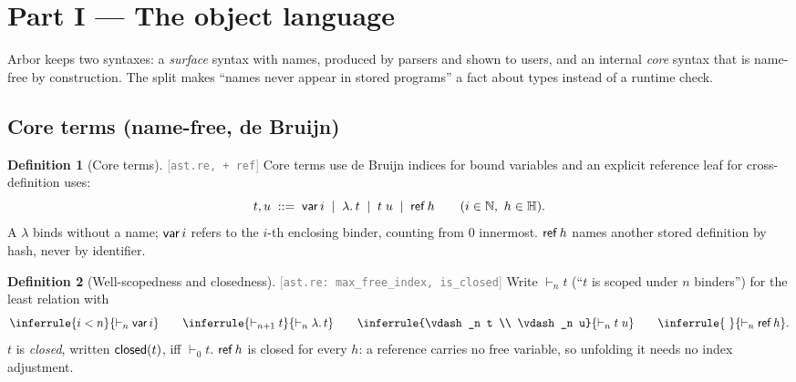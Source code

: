 \documentclass[11pt]{article}
\theoremstyle{definition}
\newtheorem{definition}{Definition}[section]
\theoremstyle{plain}
\theoremstyle{remark}
\newcommand{\src}[1]{{\footnotesize\textcolor{gray}{[\texttt{#1}]}}}
\begin{document}
\section{Part I --- The object language}\label{sec:lang}

Arbor keeps two syntaxes: a \emph{surface} syntax with names, produced by parsers and shown to
users, and an internal \emph{core} syntax that is name-free by construction. The split makes
``names never appear in stored programs'' a fact about types instead of a runtime check.

\subsection{Core terms (name-free, de Bruijn)}

\begin{definition}[Core terms]\label{def:core}
\src{ast.re, +\,ref} Core terms use de Bruijn indices for bound variables and an explicit
reference leaf for cross-definition uses:
\[
  t,u \;::=\; \mathsf{var}\,i \;\mid\; \lambda.\,t \;\mid\; t\;u \;\mid\; \mathsf{ref}\,h
  \qquad (i \in \mathbb{N},\ h \in \mathbb{H}).
\]
A $\lambda$ binds without a name; $\mathsf{var}\,i$ refers to the $i$-th enclosing binder, counting from
$0$ innermost. $\mathsf{ref}\,h$ names another stored definition by hash, never by identifier.
\end{definition}

\begin{definition}[Well-scopedness and closedness]\label{def:closed}
\src{ast.re: max\_free\_index, is\_closed} Write $\vdash_n t$ (``$t$ is scoped under $n$
binders'') for the least relation with
\[
  \inferrule{i < n}{\vdash_n \Var{i}}\qquad
  \inferrule{\vdash_{n+1} t}{\vdash_n \Lam{t}}\qquad
  \inferrule{\vdash_n t \\ \vdash_n u}{\vdash_n \App{t}{u}}\qquad
  \inferrule{\ }{\vdash_n \tRef{h}}.
\]
$t$ is \emph{closed}, written $\mathsf{closed}(t)$, iff $\vdash_0 t$. $\mathsf{ref}\,h$ is closed for
every $h$: a reference carries no free variable, so unfolding it needs no index adjustment.
\end{definition}
\end{document}
